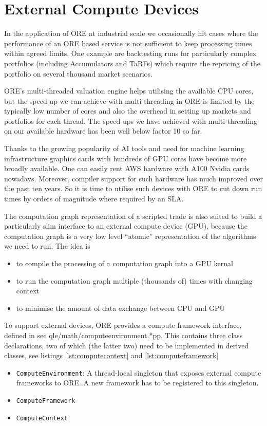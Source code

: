 \documentclass[12pt, a4paper]{report}
\begin{document}
\section{External Compute Devices}

In the application of ORE at industrial scale we occasionally hit cases where the performance of
an ORE based service is not sufficient to keep processing times within agreed limits. One example
are backtesting runs for particularly complex portfolios (including Accumulators and TaRFs) which
require the repricing of the portfolio on several thousand market scenarios.

ORE's multi-threaded valuation engine helps utilising the available CPU cores, but the speed-up we
can achieve with multi-threading in ORE is limited by the typically low number of cores and also
the overhead in setting up markets and portfolios for each thread. The speed-ups we have achieved
with multi-threading on our available hardware has been well below factor 10 so far.

Thanks to the growing popularity of AI tools and need for machine learning infrastructure graphics
cards with hundreds of GPU cores have become more broadly available. One can easily rent AWS
hardware with A100 Nvidia cards nowadays. Moreover, compiler support for such hardware has much improved
over the past ten years. So it is time to utilise such devices with ORE to
cut down run times by orders of magnitude where required by an SLA.

The computation graph representation of a scripted trade is also suited to build a particularly slim
interface to an external compute device (GPU), because the computation graph is a very
low level ``atomic'' representation of the algorithms we need to run. The idea is
\begin{itemize}
\item to compile the processing of a computation graph into a GPU kernal
\item to run the computation graph multiple (thousands of) times with changing context
\item to minimise the amount of data exchange between CPU and GPU
\end{itemize}

To support external devices, ORE provides a compute framework interface, defined in
see qle/math/computeenvironment.*pp. This contains three class declarations, two of which (the latter two)
need to be implemented in derived classes, see listings \ref{lst:computecontext} and
\ref{lst:computeframework}
\begin{itemize}
\item {\tt ComputeEnvironment}: A thread-local singleton that exposes external compute frameworks to ORE. A new framework has to be registered to this singleton.
\item {\tt ComputeFramework}
\item {\tt ComputeContext} 
\end{itemize}
\end{document}
